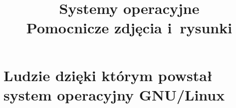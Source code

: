 \documentclass[a4paper,11pt]{article}
\title{Systemy operacyjne \\
  {\Large Pomocnicze zdjęcia i~rysunki}}
\begin{document}





\maketitle





\section{Ludzie dzięki którym powstał system operacyjny
  GNU/Linux}

\label{sec:Ludzie-dzieki-ktorym-ETC}

























\end{document}

